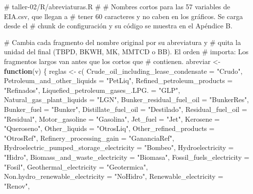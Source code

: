 \documentclass[oneside, openany, fontset=libertinus]{mitthesis}
\newenvironment{Shaded}{\begin{snugshade}}{\end{snugshade}}
\newcommand{\AttributeTok}[1]{\textcolor[rgb]{0.40,0.45,0.13}{#1}}
\newcommand{\CommentTok}[1]{\textcolor[rgb]{0.37,0.37,0.37}{#1}}
\newcommand{\ControlFlowTok}[1]{\textcolor[rgb]{0.00,0.23,0.31}{\textbf{#1}}}
\newcommand{\FunctionTok}[1]{\textcolor[rgb]{0.28,0.35,0.67}{#1}}
\newcommand{\NormalTok}[1]{\textcolor[rgb]{0.00,0.23,0.31}{#1}}
\newcommand{\OtherTok}[1]{\textcolor[rgb]{0.00,0.23,0.31}{#1}}
\newcommand{\StringTok}[1]{\textcolor[rgb]{0.13,0.47,0.30}{#1}}
\begin{document}
\begin{Shaded}
\begin{Highlighting}[]
\CommentTok{\# taller{-}02/R/abreviaturas.R}
\CommentTok{\#}
\CommentTok{\# Nombres cortos para las 57 variables de EIA.csv, que llegan a}
\CommentTok{\# tener 60 caracteres y no caben en los gráficos. Se carga desde el}
\CommentTok{\# chunk de configuración y su código se muestra en el Apéndice B.}

\CommentTok{\# Cambia cada fragmento del nombre original por su abreviatura y}
\CommentTok{\# quita la unidad del final (TBPD, BKWH, MK, MMTCD o BB). El orden}
\CommentTok{\# importa: Los fragmentos largos van antes que los cortos que}
\CommentTok{\# contienen.}
\NormalTok{abreviar }\OtherTok{\textless{}{-}} \ControlFlowTok{function}\NormalTok{(v) \{}
\NormalTok{  reglas }\OtherTok{\textless{}{-}} \FunctionTok{c}\NormalTok{(}
    \AttributeTok{Crude\_oil\_including\_lease\_condensate =} \StringTok{"Crudo"}\NormalTok{,}
    \AttributeTok{Petroleum\_and\_other\_liquids =} \StringTok{"PetLiq"}\NormalTok{,}
    \AttributeTok{Refined\_petroleum\_products =} \StringTok{"Refinados"}\NormalTok{,}
    \AttributeTok{Liquefied\_petroleum\_gases\_.LPG. =} \StringTok{"GLP"}\NormalTok{,}
    \AttributeTok{Natural\_gas\_plant\_liquids =} \StringTok{"LGN"}\NormalTok{,}
    \AttributeTok{Bunker\_residual\_fuel\_oil =} \StringTok{"BunkerRes"}\NormalTok{,}
    \AttributeTok{Bunker\_fuel =} \StringTok{"Bunker"}\NormalTok{,}
    \AttributeTok{Distillate\_fuel\_oil =} \StringTok{"Destilado"}\NormalTok{,}
    \AttributeTok{Residual\_fuel\_oil =} \StringTok{"Residual"}\NormalTok{,}
    \AttributeTok{Motor\_gasoline =} \StringTok{"Gasolina"}\NormalTok{,}
    \AttributeTok{Jet\_fuel =} \StringTok{"Jet"}\NormalTok{,}
    \AttributeTok{Kerosene =} \StringTok{"Queroseno"}\NormalTok{,}
    \AttributeTok{Other\_liquids =} \StringTok{"OtrosLiq"}\NormalTok{,}
    \AttributeTok{Other\_refined\_products =} \StringTok{"OtrosRef"}\NormalTok{,}
    \AttributeTok{Refinery\_processing\_gain =} \StringTok{"GananciaRef"}\NormalTok{,}
    \AttributeTok{Hydroelectric\_pumped\_storage\_electricity =} \StringTok{"Bombeo"}\NormalTok{,}
    \AttributeTok{Hydroelectricity =} \StringTok{"Hidro"}\NormalTok{,}
    \AttributeTok{Biomass\_and\_waste\_electricity =} \StringTok{"Biomasa"}\NormalTok{,}
    \AttributeTok{Fossil\_fuels\_electricity =} \StringTok{"Fosil"}\NormalTok{,}
    \AttributeTok{Geothermal\_electricity =} \StringTok{"Geotermica"}\NormalTok{,}
    \AttributeTok{Non.hydro\_renewable\_electricity =} \StringTok{"NoHidro"}\NormalTok{,}
    \AttributeTok{Renewable\_electricity =} \StringTok{"Renov"}\NormalTok{,}

\end{Highlighting}
\end{Shaded}
\end{document}
